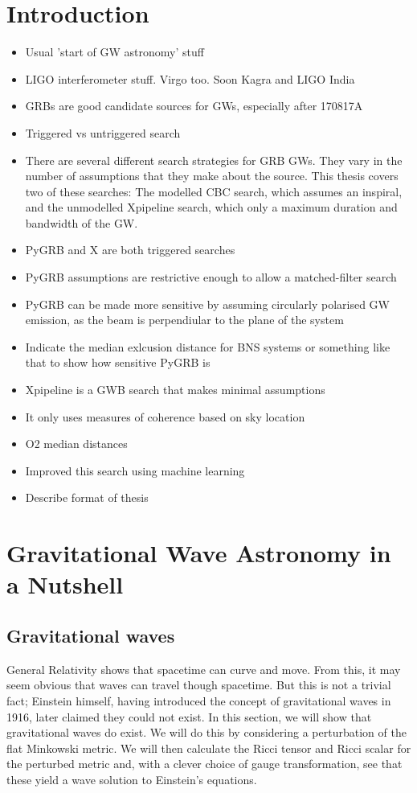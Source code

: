 \documentclass[11pt]{cuthesis}
\begin{document}
\chapter{Introduction}
\begin{itemize}
\item Usual 'start of GW astronomy' stuff
\item LIGO interferometer stuff. Virgo too. Soon Kagra and LIGO India
\item GRBs are good candidate sources for GWs, especially after 170817A
\item Triggered vs untriggered search
\item There are several different search strategies for GRB GWs. They vary in the number of assumptions that they make about the source. This thesis covers two of these searches: The modelled CBC search, which assumes an inspiral, and the unmodelled Xpipeline search, which only a maximum duration and bandwidth of the GW.
\item PyGRB and X are both triggered searches
\item PyGRB assumptions are restrictive enough to allow a matched-filter search 
\item PyGRB can be made more sensitive by assuming circularly polarised GW emission, as the beam is perpendiular to the plane of the system
\item Indicate the median exlcusion distance for BNS systems or something like that to show how sensitive PyGRB is
\item Xpipeline is a GWB search that makes minimal assumptions
\item It only uses measures of coherence based on sky location
\item O2 median distances
\item Improved this search using machine learning
\item Describe format of thesis
\end{itemize}


\chapter{Gravitational Wave Astronomy in a Nutshell} \label{chap: gw bg}



\section{Gravitational waves}
General Relativity shows that spacetime can curve and move. From this, it may seem obvious that waves can travel though spacetime. But this is not a trivial fact; Einstein himself, having introduced the concept of gravitational waves in 1916, later claimed they could not exist. In this section, we will show that gravitational waves do exist. We will do this by considering a perturbation of the flat Minkowski metric. We will then calculate the Ricci tensor and Ricci scalar for the perturbed metric and, with a clever choice of gauge transformation, see that these yield a wave solution to Einstein's equations. 
\end{document}

